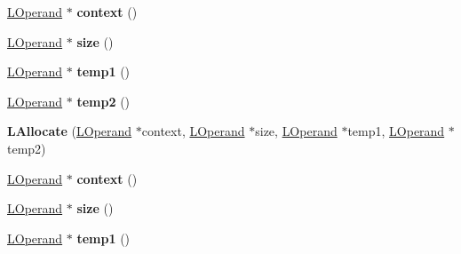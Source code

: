 \begin{DoxyCompactItemize}
\item 
\hyperlink{classv8_1_1internal_1_1_l_operand}{L\+Operand} $\ast$ {\bfseries context} ()\hypertarget{classv8_1_1internal_1_1_l_allocate_a8e8d6f1d4913d84b1ecf49b67200b7a5}{}\label{classv8_1_1internal_1_1_l_allocate_a8e8d6f1d4913d84b1ecf49b67200b7a5}

\item 
\hyperlink{classv8_1_1internal_1_1_l_operand}{L\+Operand} $\ast$ {\bfseries size} ()\hypertarget{classv8_1_1internal_1_1_l_allocate_a39b42c01160d1f69ebea869bc4b92efe}{}\label{classv8_1_1internal_1_1_l_allocate_a39b42c01160d1f69ebea869bc4b92efe}

\item 
\hyperlink{classv8_1_1internal_1_1_l_operand}{L\+Operand} $\ast$ {\bfseries temp1} ()\hypertarget{classv8_1_1internal_1_1_l_allocate_a61237f94d30caf1437601ac509815068}{}\label{classv8_1_1internal_1_1_l_allocate_a61237f94d30caf1437601ac509815068}

\item 
\hyperlink{classv8_1_1internal_1_1_l_operand}{L\+Operand} $\ast$ {\bfseries temp2} ()\hypertarget{classv8_1_1internal_1_1_l_allocate_ac6d5be0b7ea0bdf9554a0a6921c3a70d}{}\label{classv8_1_1internal_1_1_l_allocate_ac6d5be0b7ea0bdf9554a0a6921c3a70d}

\item 
{\bfseries L\+Allocate} (\hyperlink{classv8_1_1internal_1_1_l_operand}{L\+Operand} $\ast$context, \hyperlink{classv8_1_1internal_1_1_l_operand}{L\+Operand} $\ast$size, \hyperlink{classv8_1_1internal_1_1_l_operand}{L\+Operand} $\ast$temp1, \hyperlink{classv8_1_1internal_1_1_l_operand}{L\+Operand} $\ast$temp2)\hypertarget{classv8_1_1internal_1_1_l_allocate_a45d86b0f120cf9be52d2bbd0494683af}{}\label{classv8_1_1internal_1_1_l_allocate_a45d86b0f120cf9be52d2bbd0494683af}

\item 
\hyperlink{classv8_1_1internal_1_1_l_operand}{L\+Operand} $\ast$ {\bfseries context} ()\hypertarget{classv8_1_1internal_1_1_l_allocate_a8e8d6f1d4913d84b1ecf49b67200b7a5}{}\label{classv8_1_1internal_1_1_l_allocate_a8e8d6f1d4913d84b1ecf49b67200b7a5}

\item 
\hyperlink{classv8_1_1internal_1_1_l_operand}{L\+Operand} $\ast$ {\bfseries size} ()\hypertarget{classv8_1_1internal_1_1_l_allocate_a39b42c01160d1f69ebea869bc4b92efe}{}\label{classv8_1_1internal_1_1_l_allocate_a39b42c01160d1f69ebea869bc4b92efe}

\item 
\hyperlink{classv8_1_1internal_1_1_l_operand}{L\+Operand} $\ast$ {\bfseries temp1} ()\hypertarget{classv8_1_1internal_1_1_l_allocate_a61237f94d30caf1437601ac509815068}{}\label{classv8_1_1internal_1_1_l_allocate_a61237f94d30caf1437601ac509815068}


\end{DoxyCompactItemize}
